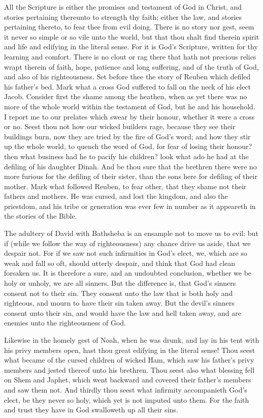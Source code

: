 All the Scripture is either the promises and testament of 
God in Christ, and stories pertaining thereunto to strength 
thy faith; either the law, and stories pertaining thereto, to 
fear thee from evil doing. There is no story nor gest, seem it 
never so simple or so vile unto the world, but that thou 
shalt find therein spirit and life and edifying in the literal 
sense. For it is God's Scripture, written for thy learning 
and comfort. There is no clout or rag there that hath not 
precious relics wrapt therein of faith, hope, patience and 
long suffering, and of the truth of God, and also of his 
righteousness. Set before thee the story of Reuben which 
defiled his father's bed. Mark what a cross God suffered 
to fall on the neck of his elect Jacob. Consider first the 
shame among the heathen, when as yet there was no more 
of the whole world within the testament of God, but he and 
his household. I report me to our prelates which swear 
by their honour, whether it were a cross or no. Seest 
thou not how our wicked builders rage, because they see 
their buildings burn, now they are tried by the fire of God's 
word; and how they stir up the whole world, to quench the 
word of God, for fear of losing their honour? then what 
business had he to pacify his children? look what ado he 
had at the defiling of his daughter Dinah. And be thou 
sure that the brethren there were no more furious for the 
defiling of their sister, than the sons here for defiling of 
their mother. Mark what followed Reuben, to fear other, 
that they shame not their fathers and mothers. He was 
cursed, and lost the kingdom, and also the priestdom, and 
his tribe or generation was ever few in number as it appeareth
in the stories of the Bible. 

The adultery of David with Bathsheba is an ensample 
not to move us to evil: but if (while we follow the way of 
righteousness) any chance drive us aside, that we despair 
not. For if we saw not such infirmities in God's elect, we, 
which are so weak and fall so oft, should utterly despair, 
and think that God had clean forsaken us. It is therefore 
a sure, and an undoubted conclusion, whether we be holy 
or unholy, we are all sinners. But the difference is, that 
God's sinners consent not to their sin. They consent unto
the law that is both holy and righteous, and mourn to 
have their sin taken away. But the devil's sinners consent
unto their sin, and would have the law and hell taken 
away, and are enemies unto the righteousness of God. 

Likewise in the homely gest of Noah, when he was 
drunk, and lay in his tent with his privy members open, 
hast thou great edifying in the literal sense! Thou seest 
what became of the cursed children of wicked Ham, which 
saw his father's privy members and jested thereof unto his 
brethren. Thou seest also what blessing fell on Shem and 
Japhet, which went backward and covered their father's 
members and saw them not. And thirdly thou seest what 
infirmity accompanieth God's elect, be they never so holy, 
which yet is not imputed unto them. For the faith and 
trust they have in God swalloweth up all their sins. 

